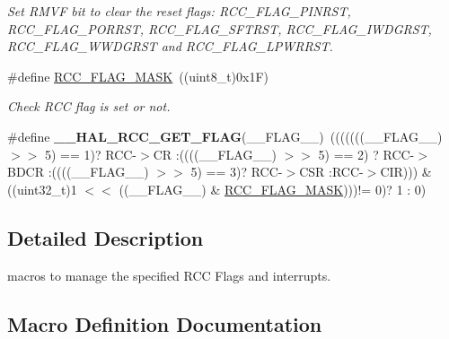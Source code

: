 \begin{DoxyCompactItemize}
\begin{DoxyCompactList}\small\item\em Set R\+M\+VF bit to clear the reset flags\+: R\+C\+C\+\_\+\+F\+L\+A\+G\+\_\+\+P\+I\+N\+R\+ST, R\+C\+C\+\_\+\+F\+L\+A\+G\+\_\+\+P\+O\+R\+R\+ST, R\+C\+C\+\_\+\+F\+L\+A\+G\+\_\+\+S\+F\+T\+R\+ST, R\+C\+C\+\_\+\+F\+L\+A\+G\+\_\+\+I\+W\+D\+G\+R\+ST, R\+C\+C\+\_\+\+F\+L\+A\+G\+\_\+\+W\+W\+D\+G\+R\+ST and R\+C\+C\+\_\+\+F\+L\+A\+G\+\_\+\+L\+P\+W\+R\+R\+ST. \end{DoxyCompactList}\item 
\#define \hyperlink{group___r_c_c___flags___interrupts___management_ga80017c6bf8a5c6f53a1a21bb8db93a82}{R\+C\+C\+\_\+\+F\+L\+A\+G\+\_\+\+M\+A\+SK}~((uint8\+\_\+t)0x1\+F)
\begin{DoxyCompactList}\small\item\em Check R\+CC flag is set or not. \end{DoxyCompactList}\item 
\#define {\bfseries \+\_\+\+\_\+\+H\+A\+L\+\_\+\+R\+C\+C\+\_\+\+G\+E\+T\+\_\+\+F\+L\+AG}(\+\_\+\+\_\+\+F\+L\+A\+G\+\_\+\+\_\+)~(((((((\+\_\+\+\_\+\+F\+L\+A\+G\+\_\+\+\_\+) $>$$>$ 5) == 1)? R\+CC-\/$>$CR \+:((((\+\_\+\+\_\+\+F\+L\+A\+G\+\_\+\+\_\+) $>$$>$ 5) == 2) ? R\+CC-\/$>$B\+D\+CR \+:((((\+\_\+\+\_\+\+F\+L\+A\+G\+\_\+\+\_\+) $>$$>$ 5) == 3)? R\+CC-\/$>$C\+SR \+:R\+CC-\/$>$C\+IR))) \& ((uint32\+\_\+t)1 $<$$<$ ((\+\_\+\+\_\+\+F\+L\+A\+G\+\_\+\+\_\+) \& \hyperlink{group___r_c_c___flags___interrupts___management_ga80017c6bf8a5c6f53a1a21bb8db93a82}{R\+C\+C\+\_\+\+F\+L\+A\+G\+\_\+\+M\+A\+SK})))!= 0)? 1 \+: 0)\hypertarget{group___r_c_c___flags___interrupts___management_gae2d7d461630562bf2a2ddb31b1f96449}{}\label{group___r_c_c___flags___interrupts___management_gae2d7d461630562bf2a2ddb31b1f96449}

\end{DoxyCompactItemize}


\subsection{Detailed Description}
macros to manage the specified R\+CC Flags and interrupts. 



\subsection{Macro Definition Documentation}
